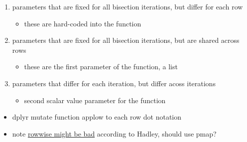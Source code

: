 \documentclass[
]{book}
\providecommand{\tightlist}{%
  \setlength{\itemsep}{0pt}\setlength{\parskip}{0pt}}
\begin{document}
\begin{enumerate}
\def\labelenumi{\arabic{enumi}.}
\tightlist
\item
  parameters that are fixed for all bisection iterations, but differ for each row

  \begin{itemize}
  \tightlist
  \item
    these are hard-coded into the function
  \end{itemize}
\item
  parameters that are fixed for all bisection iterations, but are shared across rows

  \begin{itemize}
  \tightlist
  \item
    these are the first parameter of the function, a list
  \end{itemize}
\item
  parameters that differ for each iteration, but differ acoss iterations

  \begin{itemize}
  \tightlist
  \item
    second scalar value parameter for the function
  \end{itemize}
\end{enumerate}

\begin{itemize}
\tightlist
\item
  dplyr mutate function applow to each row dot notation
\item
  note \href{https://community.rstudio.com/t/dplyr-alternatives-to-rowwise/8071}{rowwise might be bad} according to Hadley, should use pmap?
\end{itemize}
\end{document}
